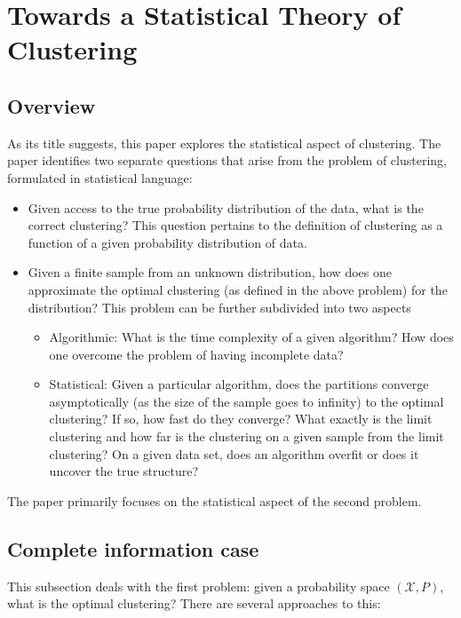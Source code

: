 \section{Towards a Statistical Theory of Clustering}

\subsection{Overview}
As its title suggests, this paper explores the statistical aspect of clustering. The paper identifies two separate questions that arise from the problem of clustering, formulated in statistical language:

\begin{itemize}
    \item Given access to the true probability distribution of the data, what is the correct clustering? This question pertains to the definition of clustering as a function of a given probability distribution of data.
    \item Given a finite sample from an unknown distribution, how does one approximate the optimal clustering (as defined in the above problem) for the distribution? This problem can be further subdivided into two aspects
    \begin{itemize}
        \item Algorithmic: What is the time complexity of a given algorithm? How does one overcome the problem of having incomplete data?
        \item Statistical: Given a particular algorithm, does the partitions converge asymptotically (as the size of the sample goes to infinity) to the optimal clustering? If so, how fast do they converge? What exactly is the limit clustering and how far is the clustering on a given sample from the limit clustering? On a given data set, does an algorithm overfit or does it uncover the true structure?
    \end{itemize}
\end{itemize}

The paper primarily focuses on the statistical aspect of the second problem. 

\subsection{Complete information case}

This subsection deals with the first problem: given a probability space $(\mathcal{X}, P)$, what is the optimal clustering? There are several approaches to this:

